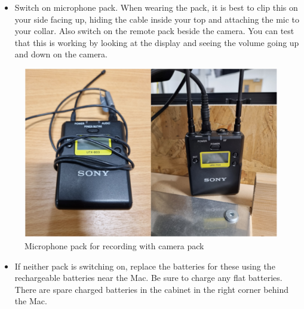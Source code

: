 \documentclass[
]{book}
\providecommand{\tightlist}{%
  \setlength{\itemsep}{0pt}\setlength{\parskip}{0pt}}
\begin{document}
\begin{itemize}
\tightlist
\item
  Switch on microphone pack. When wearing the pack, it is best to clip this on your side facing up, hiding the cable inside your top and attaching the mic to your collar. Also switch on the remote pack beside the camera. You can test that this is working by looking at the display and seeing the volume going up and down on the camera.
\end{itemize}

\begin{figure}

{\centering \includegraphics[width=1\linewidth]{Microphone} 

}

\caption{Microphone pack for recording with camera pack}\label{fig:microphone}
\end{figure}

\begin{itemize}
\tightlist
\item
  If neither pack is switching on, replace the batteries for these using the rechargeable batteries near the Mac. Be sure to charge any flat batteries. There are spare charged batteries in the cabinet in the right corner behind the Mac.
\end{itemize}
\end{document}
